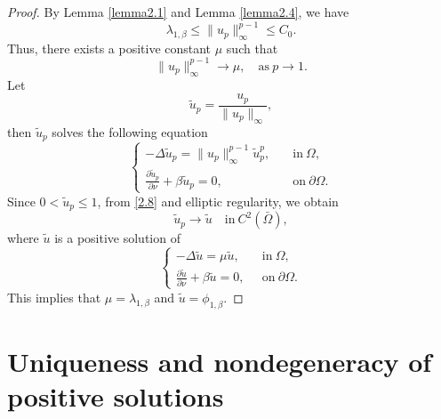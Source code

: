 \documentclass[12pt,reqno]{amsart}
\numberwithin{equation}{section}
\newtheorem{lemma}[theorem]{Lemma}
\theoremstyle{definition}
\begin{document}
\begin{proof}
By Lemma \ref{lemma2.1} and Lemma \ref{lemma2.4}, we have 
$$
\lambda_{1,\beta}\le \|u_p\|_\infty^{p-1}\le C_0.
$$
Thus, there exists a positive constant $\mu$ such that 
\begin{equation}\label{2.8}
\|u_p\|_\infty^{p-1}\to \mu,\quad \text{as}\ p\to1.
\end{equation}
Let 
$$
\tilde{u}_p=\frac{u_p}{\|u_p\|_\infty},
$$
then $\tilde{u}_p$ solves the following equation
\begin{equation}
\begin{cases}
-\Delta \tilde{u}_p=\|u_p\|_\infty^{p-1}\tilde{u}_p^p,\quad &\text{in}\ \Omega,\\
\frac{\partial \tilde{u}_p}{\partial \nu}+\beta\tilde{u}_p=0, &\text{on}\ \partial\Omega.
\end{cases}
\end{equation}
Since $0<\tilde{u}_p\le 1$, from \eqref{2.8} and elliptic regularity, we obtain 
$$
\tilde{u}_p\to \tilde{u}\quad \text{in}\ C^2(\bar{\Omega}),
$$
where $\tilde{u}$ is a positive solution of 
\begin{equation}
\begin{cases}
-\Delta \tilde{u}=\mu\tilde{u},\quad &\text{in}\ \Omega,\\
\frac{\partial \tilde{u}}{\partial \nu}+\beta\tilde{u}=0, &\text{on}\ \partial\Omega.
\end{cases}
\end{equation}
This implies that $\mu=\lambda_{1,\beta}$ and $\tilde{u}=\phi_{1,\beta}$.
\end{proof}











\section{Uniqueness and nondegeneracy of positive solutions}

%
\end{document}
